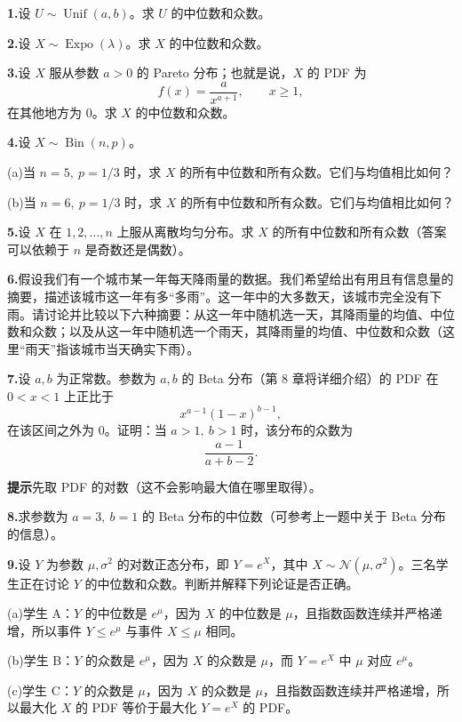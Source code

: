 \documentclass[UTF8, 12pt, fontset=fandol, oneside]{ctexart}
\begin{document}
\noindent\textbf{1.}\quad 设 $U\sim\operatorname{Unif}(a,b)$。求 $U$ 的中位数和众数。

\noindent\textbf{2.}\quad 设 $X\sim\operatorname{Expo}(\lambda)$。求 $X$ 的中位数和众数。

\noindent\textbf{3.}\quad 设 $X$ 服从参数 $a>0$ 的 Pareto 分布；也就是说，$X$ 的 PDF 为
\[
  f(x)=\frac{a}{x^{a+1}},\qquad x\ge1,
\]
在其他地方为 $0$。求 $X$ 的中位数和众数。

\noindent\textbf{4.}\quad 设 $X\sim\operatorname{Bin}(n,p)$。

\noindent (a)\quad 当 $n=5,\ p=1/3$ 时，求 $X$ 的所有中位数和所有众数。它们与均值相比如何？

\noindent (b)\quad 当 $n=6,\ p=1/3$ 时，求 $X$ 的所有中位数和所有众数。它们与均值相比如何？

\noindent\textbf{5.}\quad 设 $X$ 在 $1,2,\ldots,n$ 上服从离散均匀分布。求 $X$ 的所有中位数和所有众数（答案可以依赖于 $n$ 是奇数还是偶数）。

\noindent\textbf{6.}\quad 假设我们有一个城市某一年每天降雨量的数据。我们希望给出有用且有信息量的摘要，描述该城市这一年有多“多雨”。这一年中的大多数天，该城市完全没有下雨。请讨论并比较以下六种摘要：从这一年中随机选一天，其降雨量的均值、中位数和众数；以及从这一年中随机选一个雨天，其降雨量的均值、中位数和众数（这里“雨天”指该城市当天确实下雨）。

\noindent\textbf{7.}\quad 设 $a,b$ 为正常数。参数为 $a,b$ 的 Beta 分布（第 8 章将详细介绍）的 PDF 在 $0<x<1$ 上正比于
\[
  x^{a-1}(1-x)^{b-1},
\]
在该区间之外为 $0$。证明：当 $a>1,\ b>1$ 时，该分布的众数为
\[
  \frac{a-1}{a+b-2}.
\]

\noindent\textbf{提示}\quad 先取 PDF 的对数（这不会影响最大值在哪里取得）。

\noindent\textbf{8.}\quad 求参数为 $a=3,\ b=1$ 的 Beta 分布的中位数（可参考上一题中关于 Beta 分布的信息）。

\noindent\textbf{9.}\quad 设 $Y$ 为参数 $\mu,\sigma^2$ 的对数正态分布，即 $Y=e^X$，其中 $X\sim\mathcal{N}(\mu,\sigma^2)$。三名学生正在讨论 $Y$ 的中位数和众数。判断并解释下列论证是否正确。

\noindent (a)\quad 学生 A：$Y$ 的中位数是 $e^\mu$，因为 $X$ 的中位数是 $\mu$，且指数函数连续并严格递增，所以事件 $Y\le e^\mu$ 与事件 $X\le\mu$ 相同。

\noindent (b)\quad 学生 B：$Y$ 的众数是 $e^\mu$，因为 $X$ 的众数是 $\mu$，而 $Y=e^X$ 中 $\mu$ 对应 $e^\mu$。

\noindent (c)\quad 学生 C：$Y$ 的众数是 $\mu$，因为 $X$ 的众数是 $\mu$，且指数函数连续并严格递增，所以最大化 $X$ 的 PDF 等价于最大化 $Y=e^X$ 的 PDF。
\end{document}
